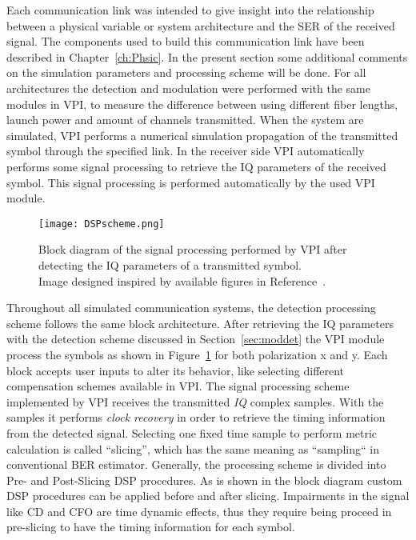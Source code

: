 Each communication link was intended to give insight into the relationship between a physical variable or system architecture and the SER of the received signal. The components used to build this communication link have been described in Chapter~\ref{ch:Phsic}. In the present section some additional comments on the simulation parameters and processing scheme will be done. For all architectures the detection and modulation were performed with the same modules in VPI, to measure the difference between using different fiber lengths, launch power and amount of channels transmitted. When the system are simulated, VPI performs a numerical simulation propagation of the transmitted symbol through the specified link. In the receiver side VPI automatically performs some signal processing to retrieve the IQ parameters of the received symbol. This signal processing is performed automatically by the used VPI module.      
 	



\begin{figure}[h!]
\centering
\texttt{[image: DSPscheme.png]}
\caption{Block diagram of the signal processing performed by VPI after detecting the IQ parameters of a transmitted symbol.\\ {\scriptsize Image designed inspired by available figures in Reference~\cite{transmissionvpi}. }}
\label{fig:dspvpi}
\end{figure}


Throughout all simulated communication systems, the detection processing scheme follows the same block architecture. After retrieving the IQ parameters with the detection scheme discussed in Section~\ref{sec:moddet} the VPI module process the symbols as shown in Figure~\ref{fig:dspvpi} for both polarization x and y. Each block accepts user inputs to alter its behavior, like selecting different compensation schemes available in VPI. The signal processing scheme implemented by VPI receives the transmitted \emph{IQ} complex samples. With the samples it performs \textit{clock recovery} in order to retrieve the timing information from the detected signal. Selecting one fixed time sample to perform metric calculation is called “slicing”, which has the same meaning as “sampling“ in conventional BER estimator.  Generally, the processing scheme is divided into  Pre- and Post-Slicing DSP procedures. As is shown in the block diagram custom DSP procedures can be applied before and after slicing. Impairments in the signal like CD and CFO are time dynamic effects, thus they require being proceed in pre-slicing to have the timing information for each symbol. 


